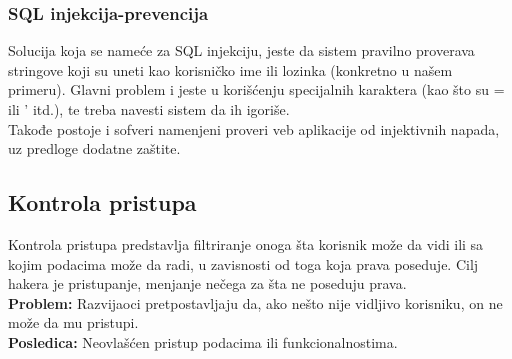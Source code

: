 \documentclass[a4paper]{article}
\begin{document}
\subsubsection{SQL injekcija-prevencija}
Solucija koja se name\'{c}e za SQL injekciju, jeste da sistem pravilno proverava stringove koji su uneti kao korisni\v{c}ko ime ili lozinka (konkretno u na\v{s}em primeru). Glavni problem i jeste u kori\v{s}\'{c}enju specijalnih karaktera (kao \v{s}to su = ili ' itd.), te treba navesti sistem da ih igori\v{s}e.\\
Takođe postoje i sofveri namenjeni proveri  veb aplikacije od injektivnih napada, uz predloge dodatne za\v{s}tite.
\subsection{Kontrola pristupa}
Kontrola pristupa predstavlja filtriranje onoga \v{s}ta korisnik mo\v{z}e da vidi ili sa kojim podacima mo\v{z}e da radi,  u zavisnosti od toga koja prava poseduje. Cilj hakera je pristupanje, menjanje ne\v{c}ega za \v{s}ta ne poseduju prava.\\
\textbf{Problem:} Razvijaoci pretpostavljaju da, ako ne\v{s}to nije vidljivo korisniku, on ne mo\v{z}e da mu pristupi.\\
\textbf{Posledica:} Neovla\v{s}\'{c}en pristup podacima ili funkcionalnostima.
\end{document}

